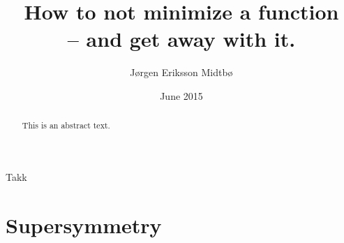 \documentclass[twoside,english]{uiofysmaster}
\author{J\o rgen Eriksson Midtb\o}
\title{How to not minimize a function \\
-- and get away with it.}
\date{June 2015}
\begin{document}
\lstset{language=Python}


\cleardoublepage

\begin{abstract}
This is an abstract text.
\end{abstract}


\begin{acknowledgements}
  Takk
\end{acknowledgements}

\tableofcontents
\listoffigures
\listoftables


\chapter{Supersymmetry}

\end{document}
